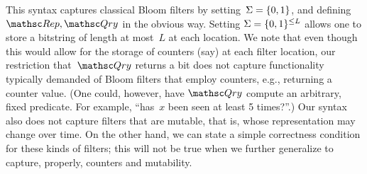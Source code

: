 This syntax captures classical Bloom filters by setting~$\Sigma=\{0,1\}$,  and defining $\Rep,\Qry$ in the obvious way.  Setting $\Sigma=\{0,1\}^{\leq L}$ allows one to store a bitstring of length at most~$L$ at each location.   We note that even though this would allow for the storage of counters (say) at each filter location, our restriction that~$\Qry$ returns a bit does not capture functionality typically demanded of Bloom filters that employ counters, e.g., returning a counter value. (One could, however, have $\Qry$ compute an arbitrary, fixed predicate.  For example, ``has~$x$ been seen at least 5 times?''.)  
Our syntax also does not capture filters that are mutable, that is, whose representation may change over time. 
On the other hand, we can state a simple correctness condition for these kinds of filters; this will not be true when we further generalize to capture, properly, counters and mutability.

 


